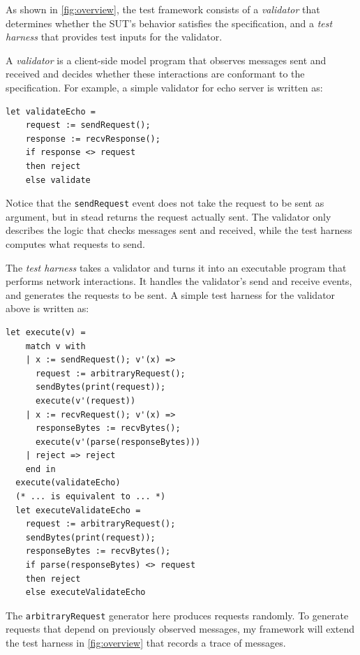 \documentclass{article}
\newcommand{\ilc}[1]{\lstinline[style=customcoq]{#1}}
\theoremstyle{definition}
\begin{document}
As shown in \autoref{fig:overview}, the test framework consists of a {\em
  validator} that determines whether the SUT's behavior satisfies the
specification, and a {\em test harness} that provides test inputs for the
validator.

A {\em validator} is a client-side model program that observes messages sent and
received and decides whether these interactions are conformant to the
specification.  For example, a simple validator for echo server is written as:
\begin{lstlisting}[style=customcoq]
  let validateEcho =
    request := sendRequest();
    response := recvResponse();
    if response <> request
    then reject
    else validate
\end{lstlisting}
Notice that the \ilc{sendRequest} event does not take the request to be sent as
argument, but in stead returns the request actually sent.  The validator only
describes the logic that checks messages sent and received, while the test
harness computes what requests to send.

The {\em test harness} takes a validator and turns it into an executable program
that performs network interactions.  It handles the validator's send and receive
events, and generates the requests to be sent.  A simple test harness for the
validator above is written as:
\begin{lstlisting}[style=customcoq]
  let execute(v) =
    match v with
    | x := sendRequest(); v'(x) =>
      request := arbitraryRequest();
      sendBytes(print(request));
      execute(v'(request))
    | x := recvRequest(); v'(x) =>
      responseBytes := recvBytes();
      execute(v'(parse(responseBytes)))
    | reject => reject
    end in
  execute(validateEcho)
  (* ... is equivalent to ... *)
  let executeValidateEcho =
    request := arbitraryRequest();
    sendBytes(print(request));
    responseBytes := recvBytes();
    if parse(responseBytes) <> request
    then reject
    else executeValidateEcho
\end{lstlisting}

The \ilc{arbitraryRequest} generator here produces requests randomly.  To
generate requests that depend on previously observed messages, my framework will
extend the test harness in \autoref{fig:overview} that records a trace of
messages.
\end{document}
